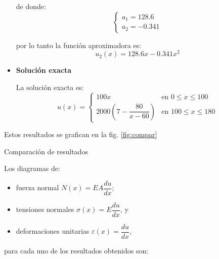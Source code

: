 \begin{example}
\begin{itemize}
		de donde:
		\begin{equation}
			\begin{cases}
				a_1 = 128.6 \\ a_2 = -0.341
			\end{cases}
			\label{eq:coefs}
		\end{equation}
		
		por lo tanto la función aproximadora es:
		\begin{equation*}
			u_2(x) = 128.6x - 0.341 x^2
		\end{equation*}
		
		\item \textbf{Solución exacta}
		
		La solución exacta es:
		\begin{equation*}
			u(x) = \begin{cases}
				100 x & \mbox{en } 0 \le x \le 100 \\
				2000\left(7 - \dfrac{80}{x - 60}\right) & \mbox{en } 100 \le x \le 180
			\end{cases}
		\end{equation*}
	\end{itemize}
		
	Estos resultados se grafican en la fig. \ref{fig:compar}
	\begin{marginfigure}[-3cm]
		\centering
	\caption{Comparación de resultados}
	\label{fig:compar}
	\end{marginfigure}
	Los diagramas de:
	\begin{itemize}
		\item fuerza normal $N(x) = EA \dfrac{du}{dx}$;
		\item tensiones normales $\sigma(x) = E \dfrac{du}{dx}$, y
		\item deformaciones unitarias $\varepsilon(x) =  \dfrac{du}{dx}$,
	\end{itemize} para cada uno de los resultados obtenidos son:
	

\end{example}

